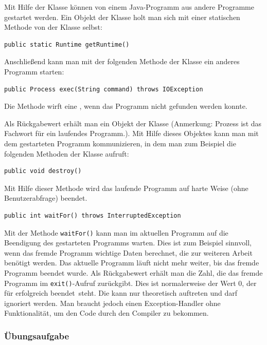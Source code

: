 Mit Hilfe der Klasse  können von einem Java-Programm aus andere
Programme gestartet werden. Ein Objekt der Klasse  holt man
sich mit einer statischen Methode von der Klasse  selbst:

\begin{lstlisting}
public static Runtime getRuntime()
\end{lstlisting}

Anschließend kann man mit der folgenden Methode der Klasse  ein
anderes Programm starten:

\begin{lstlisting}
public Process exec(String command) throws IOException
\end{lstlisting}

Die Methode wirft eine , wenn das Programm nicht gefunden
werden konnte.

Als Rückgabewert erhält man ein Objekt der Klasse  (Anmerkung:
Prozess ist das Fachwort für ein laufendes Programm.). Mit Hilfe dieses
Objektes kann man mit dem gestarteten Programm \glqq kommunizieren\grqq , in dem
man zum Beispiel die folgenden Methoden der Klasse  aufruft:

\begin{lstlisting}
public void destroy()
\end{lstlisting}

Mit Hilfe dieser Methode wird das laufende Programm auf harte Weise (ohne
Benutzerabfrage) beendet.

\begin{lstlisting}
public int waitFor() throws InterruptedException
\end{lstlisting}

Mit der Methode \lstinline|waitFor()| kann man im aktuellen Programm auf die
Beendigung des gestarteten Programms warten. Dies ist zum Beispiel sinnvoll,
wenn das fremde Programm wichtige Daten berechnet, die zur weiteren Arbeit
benötigt werden. Das aktuelle Programm läuft nicht mehr weiter,  bis das fremde
Programm beendet wurde. Als Rückgabewert erhält man die Zahl, die das fremde
Programm im \lstinline|exit()|-Aufruf zurückgibt. Dies ist normalerweise der
Wert 0, der für \glqq erfolgreich beendet\grqq\ steht. Die
 kann nur theoretisch auftreten und darf ignoriert
werden. Man braucht jedoch einen Exception-Handler ohne Funktionalität, um den
Code durch den Compiler zu bekommen.

\subsubsection{Übungsaufgabe}


